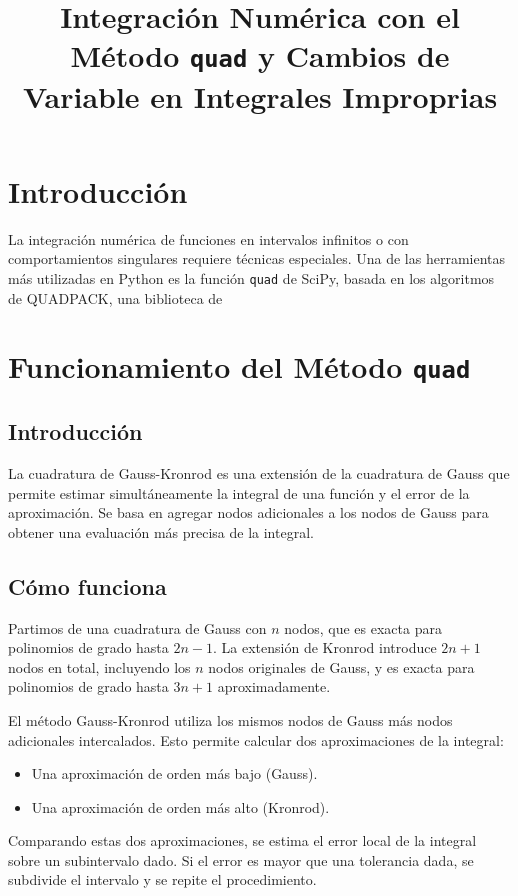 \documentclass{article}
\title{Integraci\'on Num\'erica con el M\'etodo \texttt{quad} y Cambios de Variable en Integrales Improprias}
\author{}
\date{}
\begin{document}
\maketitle

\section{Introducción}
La integración numérica de funciones en intervalos infinitos o con comportamientos singulares requiere t\'ecnicas especiales. Una de las herramientas más utilizadas en Python es la función \texttt{quad} de SciPy, basada en los algoritmos de QUADPACK, una biblioteca de 

\section{Funcionamiento del Método \texttt{quad}}
\subsection{Introducción}
La cuadratura de Gauss-Kronrod es una extensión de la cuadratura de Gauss que permite estimar simultáneamente la integral de una función y el error de la aproximación. Se basa en agregar nodos adicionales a los nodos de Gauss para obtener una evaluación más precisa de la integral.

\subsection{Cómo funciona}
Partimos de una cuadratura de Gauss con $n$ nodos, que es exacta para polinomios de grado hasta $2n-1$. La extensi\'on de Kronrod introduce $2n+1$ nodos en total, incluyendo los $n$ nodos originales de Gauss, y es exacta para polinomios de grado hasta $3n+1$ aproximadamente.

El método Gauss-Kronrod utiliza los mismos nodos de Gauss más nodos adicionales intercalados. Esto permite calcular dos aproximaciones de la integral:
\begin{itemize}
    \item Una aproximación de orden más bajo (Gauss).
    \item Una aproximación de orden más alto (Kronrod).
\end{itemize}

Comparando estas dos aproximaciones, se estima el error local de la integral sobre un subintervalo dado. Si el error es mayor que una tolerancia dada, se subdivide el intervalo y se repite el procedimiento.
\end{document}
